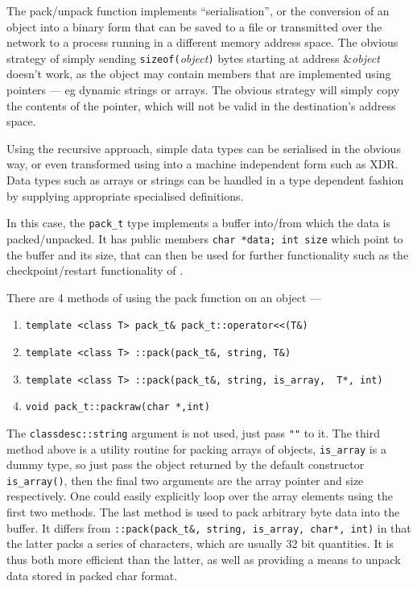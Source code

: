 The pack/unpack function implements
``serialisation'', or the conversion of an object
into a binary form that can be saved to a file or transmitted over the
network to a process running in a different memory address space. The
obvious strategy of simply sending {\tt sizeof(}{\em object}{\tt )}
bytes starting at address \&{\em object} doesn't work, as the object
may contain members that are implemented using pointers --- eg dynamic
strings or arrays. The obvious strategy will simply copy the contents
of the pointer, which will not be valid in the destination's address
space.

Using the recursive approach, simple data types can be serialised in
the obvious way, or even transformed using into a machine independent
form such as XDR. Data types such as arrays or strings can
be handled in a type dependent fashion by supplying appropriate specialised
definitions.

In this case, the {\tt pack\_t} type implements a buffer into/from
which the data is packed/unpacked. It has public members {\tt char
*data; int size} which point to the buffer and its size, that can then
be used for further functionality such as the
checkpoint/restart functionality of
\EcoLab{}.

There are 4 methods of using the pack function on an object ---
\begin{enumerate}
\item \verb+template <class T> pack_t& pack_t::operator<<(T&)+
\item \verb+template <class T> ::pack(pack_t&, string, T&)+ 
\item \verb+template <class T> ::pack(pack_t&, string, is_array,  T*, int)+
\item \verb+void pack_t::packraw(char *,int)+
\end{enumerate}
The \verb+classdesc::string+ argument is not used, just pass \verb+""+ to
it. The third method above is a utility routine for packing arrays of
objects, \verb+is_array+ is a dummy type, so just pass the object
returned by the default constructor \verb+is_array()+, then the final
two arguments are the array pointer and size respectively. One could
easily explicitly loop over the array elements using the first two
methods.  The last method is used to pack arbitrary byte data into the
buffer.  It differs from
\verb+::pack(pack_t&, string, is_array, char*, int)+ in that the
latter packs a series of characters, which are usually 32 bit
quantities. It is thus both more efficient than the latter, as well as
providing a means to unpack data stored in packed char format.

